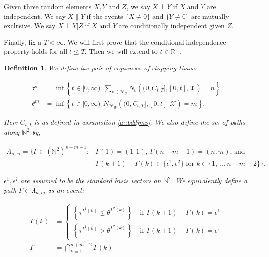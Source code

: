 \documentclass[12pt]{article}
\newcommand{\mb}{\mathbb}
\newcommand{\mc}{\mathcal}
\newcommand{\te}{\text}
\newcommand{\ep}{\epsilon}
\newcommand{\ind}{\hspace{24pt}}
\newcommand{\sta}{\mc{X}}							%
\newcommand{\neigh}[1]{\mc{N}_{#1}}					%
\newcommand{\indx}[1]{^{#1}}						%
\newcommand{\Xf}{X}									%
\newcommand{\poiss}{N}								%
\newcommand{\poissv}[1]{_{#1}}						%
\newcommand{\jumpibd}[2]{C_{#1,#2}}					%
\newcommand{\Xg}{Y}									%
\newcommand{\rt}{\tau}								%
\newcommand{\ev}[1]{\ep^{#1}}						%
\newcommand{\Xh}{Z}									%
\newcommand{\seto}{U}								%
\newcommand{\sett}{W}								%
\newcommand{\mutex}{\|}								%
\newcommand{\rtt}{\theta}							%
\newcommand{\apath}{\Gamma}						%
\newcommand{\pathset}[2]{\Lambda_{#1,#2}}		%
\newcommand{\indo}{n}							%
\newcommand{\indt}{m}							%
\newtheorem{defn}[thms]{Definition}
\begin{document}
\ind Given three random elements \(\Xf,\Xg \te{ and } \Xh\), we say \(\Xf\perp \Xg\) if \(\Xf\) and \(\Xg\) are independent. We say \(\Xf\mutex \Xg\) if the events \(\{\Xf\neq 0\}\) and \(\{\Xg \neq 0\}\) are mutually exclusive. We say \(\Xf\perp \Xg|\Xh\) if \(\Xf\) and \(\Xg\) are conditionally independent given \(\Xh\).

\ind Finally, fix a \(T < \infty\). We will first prove that the conditional independence property holds for all \(t \leq T\). Then we will extend to \(t \in \mb{R}^+\).

\begin{defn}
We define the pair of sequences of stopping times:

\begin{align*}
\rt\indx{\indo} &= \inf \left\{t \in [0,\infty): \sum_{v \in \neigh{\seto}}\poiss\poissv{v}\left((0,\jumpibd{i}{T}],[0,t],\sta \right) = \indo\right\}\\
\rtt\indx{\indt} &= \inf \left\{t \in [0,\infty): \poiss\poissv{\neigh{\sett}}\left((0,\jumpibd{i}{T}],[0,t],\sta \right) = \indt\right\}.
\end{align*}

Here \(\jumpibd{i}{T}\) is as defined in assumption \ref{a::bddjmp}. We also define the set of paths along \(\mb{N}^2\) by,

\begin{align}
\pathset{\indo}{\indt} = \{\apath \in (\mb{N}^2)^{\indo+\indt-1}: &\apath(1) = (1,1)\te{, } \apath(\indo+\indt-1) = (\indo,\indt)\te{, and } \nonumber\\
&\apath(k+1) - \apath(k)\in \{\ev{1},\ev{2}\}\te{ for }k\in \{1,\dots, \indo+\indt-2\}\}.
\label{CIpf::Lambda}
\end{align}

\(\ev{1},\ev{2}\) are assumed to be the standard basis vectors on \(\mb{N}^2\). We equivalently define a path \(\apath \in \pathset{\indo}{\indt}\) as an event:

\begin{align}
\apath(k) &= \begin{cases}
\left\{\rt\indx{\apath\indx{1}(k)} \leq \rtt\indx{\apath\indx{2}(k)}\right\} &\te{ if } \apath(k+1) - \apath(k) = \ev{1}\\
\left\{\rt\indx{\apath\indx{1}(k)} > \rtt\indx{\apath\indx{2}(k)}\right\} &\te{ if } \apath(k+1) - \apath(k) = \ev{2}
\end{cases}\\
\apath &= \bigcap_{k=1}^{\indo+\indt-2} \apath(k)
\label{CIpf::Gamma}
\end{align}
\label{CIpf::GammaLambda}
\end{defn}
\end{document}
